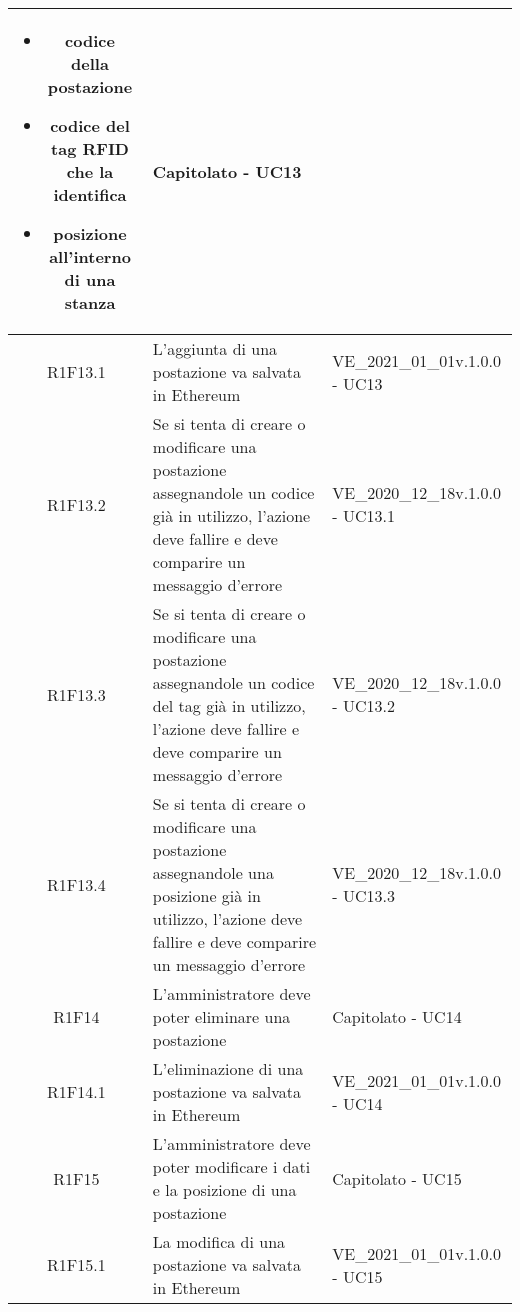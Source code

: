 \begin{center}
\begin{longtable}{|c|p{10cm}|p{4cm}|}
\begin{itemize}
			\item codice della postazione
			\item codice del tag RFID che la identifica
			\item posizione all'interno di una stanza
		\end{itemize} & Capitolato - UC13	\\
		\hline
		R1F13.1&L'aggiunta di una postazione va salvata in Ethereum	&VE\_2021\_01\_01v.1.0.0 - UC13 	\\
		\hline
		R1F13.2&	Se si tenta di creare o modificare una postazione assegnandole un codice già in utilizzo, l'azione deve fallire e deve comparire un messaggio d'errore& VE\_2020\_12\_18v.1.0.0 - UC13.1 	\\
		\hline
		R1F13.3&Se si tenta di creare o modificare una postazione assegnandole un codice del tag già in utilizzo, l'azione deve fallire e deve comparire un messaggio d'errore	&VE\_2020\_12\_18v.1.0.0 - UC13.2 	\\
		\hline
		R1F13.4&Se si tenta di creare o modificare una postazione assegnandole una posizione già in utilizzo, l'azione deve fallire e deve comparire un messaggio d'errore	&VE\_2020\_12\_18v.1.0.0 - UC13.3 	\\
		\hline
		R1F14&L'amministratore deve poter eliminare una postazione	& Capitolato - UC14	\\
		\hline
		R1F14.1	&L'eliminazione di una postazione va salvata in Ethereum	& VE\_2021\_01\_01v.1.0.0 - UC14	\\
		\hline
		R1F15&L'amministratore deve poter modificare i dati e la posizione di una postazione	& Capitolato - UC15	\\
		\hline
		R1F15.1&	La modifica di una postazione va salvata in Ethereum& VE\_2021\_01\_01v.1.0.0 - UC15	\\
		\hline
		

\end{longtable}
\end{center}
